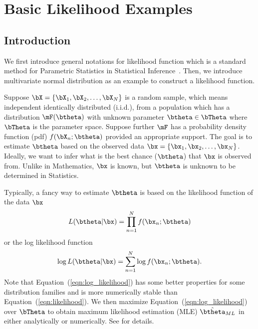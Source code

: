 
\chapter{Basic Likelihood Examples}
\label{chp:mle}


\section{Introduction}

We first introduce general notations for likelihood function
which is a standard method for Parametric Statistics in
Statistical Inference~\citep{Casella2001}.
Then, we introduce multivariate normal
distribution
as an example to construct a likelihood function.

Suppose $\bX = \{\bX_1, \bX_2, \ldots, \bX_N\}$ is a random sample,
which means independent identically distributed
(i.i.d.),
from a population which has a distribution $\mF(\btheta)$ with unknown
parameter $\btheta \in \bTheta$ where $\bTheta$ is the parameter space.
Suppose further $\mF$ has a probability density function
(pdf)
$f(\bX_n; \btheta)$ provided an appropriate support.
The goal is to estimate $\btheta$ based on the observed data
$\bx = \{\bx_1, \bx_2, \ldots, \bx_N\}$.
Ideally, we want to infer what is the best chance ($\btheta$)
that $\bx$ is observed from.
Unlike in Mathematics, $\bx$ is known, but $\btheta$ is unknown
to be determined in Statistics.

Typically, a fancy way to estimate $\btheta$ is based on the
likelihood function of the data $\bx$
\begin{equation}
L(\btheta|\bx) = \prod_{n = 1}^N f(\bx_n; \btheta)
\label{eqn:likelihood}
\end{equation}
or the log likelihood function
\begin{equation}
\log L(\btheta|\bx) = \sum_{n = 1}^N \log f(\bx_n; \btheta).
\label{eqn:log_likelihood}
\end{equation}
Note that Equation~(\ref{eqn:log_likelihood}) has some
better properties for some distribution families and
is more numerically stable than Equation~(\ref{eqn:likelihood}).
We then maximize Equation~(\ref{eqn:log_likelihood})
over $\bTheta$ to obtain maximum likelihood estimation
(MLE) $\hat{\btheta}_{ML}$ in either analytically or numerically.
See \citet{Casella2001} for details.

